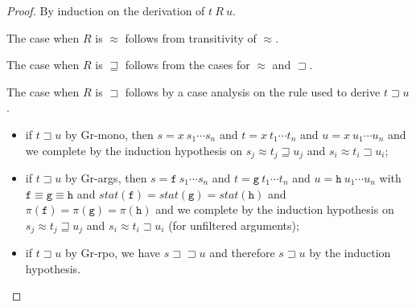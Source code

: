 \documentclass[a4paper,USenglish,cleveref,autoref,thm-restate]{lipics-v2021}
\newcommand{\grmain}{\sqsupset}
\newcommand{\geqmain}{\sqsupseteq}
\newcommand{\ismain}{\approx}
\newcommand{\rpomain}{\sqsupset\!\!\sqsupset}
\newcommand{\eqpred}{\equiv}
\newcommand{\symb}[1]{\mathtt{#1}}
\newcommand{\afun}{\symb{f}}
\newcommand{\bfun}{\symb{g}}
\newcommand{\cfun}{\symb{h}}
\newcommand{\status}{\mathit{stat}}
\newcommand{\filter}{\pi}
\begin{document}
\begin{proof}
By induction on the derivation of $t\ R\ u$.

The case when $R$ is $\ismain$ follows from transitivity of $\ismain$.

The case when $R$ is $\geqmain$ follows from the cases for $\ismain$ and $\grmain$.

The case when $R$ is $\grmain$ follows by a case analysis on the rule used to derive $t \grmain u$.
\begin{itemize}
\item if $t \grmain u$ by Gr-mono, then $s = x\ s_1 \cdots s_n$ and $t = x\ t_1 \cdots t_n$ and
  $u = x\ u_1 \cdots u_n$ and we complete by the induction hypothesis on $s_j \ismain t_j \geqmain
  u_j$ and $s_i \ismain t_i \grmain u_i$;
\item if $t \grmain u$ by Gr-args, then $s = \afun\ s_1 \cdots s_n$ and $t = \bfun\ t_1 \cdots t_n$
  and $u = \cfun\ u_1 \cdots u_n$ with $\afun \eqpred \bfun \eqpred \cfun$ and
  $\status(\afun) = \status(\bfun) = \status(\cfun)$ and $\filter(\afun) = \filter(\bfun) =
  \filter(\cfun)$ and we complete by the induction hypothesis on $s_j \ismain t_j
  \geqmain u_j$ and $s_i \ismain t_i \grmain u_i$ (for unfiltered arguments);
\item if $t \grmain u$ by Gr-rpo, we have $s \rpomain u$ and therefore $s \grmain u$ by the
  induction hypothesis.
\end{itemize}


\end{proof}
\end{document}
